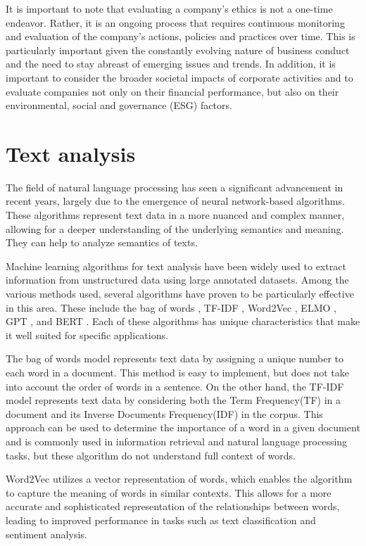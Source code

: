 \documentclass[PI]{ProjectProposal}
\begin{document}
It is important to note that evaluating a company's ethics is not a one-time endeavor. Rather, it is an ongoing process that requires continuous monitoring and evaluation of the company's actions, policies and practices over time. This is particularly important given the constantly evolving nature of business conduct and the need to stay abreast of emerging issues and trends. In addition, it is important to consider the broader societal impacts of corporate activities and to evaluate companies not only on their financial performance, but also on their environmental, social and governance (ESG) factors.
\section{Text analysis}
\label{sec:org667b440}
The field of natural language processing has seen a significant advancement in recent years\autocites{devlin2018bert}[][]{wang2018glue}, largely due to the emergence of neural network-based algorithms. These algorithms represent text data in a more nuanced and complex manner, allowing for a deeper understanding of the underlying semantics and meaning. They can help to analyze semantics of texts.

Machine learning algorithms for text analysis have been widely used to extract information from unstructured data using large annotated datasets. Among the various methods used, several algorithms have proven to be particularly effective in this area. These include the bag of words \autocite{doi:10.1080/00437956.1954.11659520}, TF-IDF \autocite{jones1972statistical}, Word2Vec\autocite{mikolov2013distributed} , ELMO \autocite{elmo}, GPT \autocite{radford2019language}, and BERT \autocite{devlin2018bert}. Each of these algorithms has unique characteristics that make it well suited for specific applications.

The bag of words model represents text data by assigning a unique number to each word in a document. This method is easy to implement, but does not take into account the order of words in a sentence. On the other hand, the TF-IDF model represents text data by considering both the Term Frequency(TF) in a document and its Inverse Documents Frequency(IDF) in the corpus. This approach can be used to determine the importance of a word in a given document and is commonly used in information retrieval and natural language processing tasks, but these algorithm do not understand full context of words.

Word2Vec utilizes a vector representation of words, which enables the algorithm to capture the meaning of words in similar contexts. This allows for a more accurate and sophisticated representation of the relationships between words, leading to improved performance in tasks such as text classification and sentiment analysis.
\end{document}
